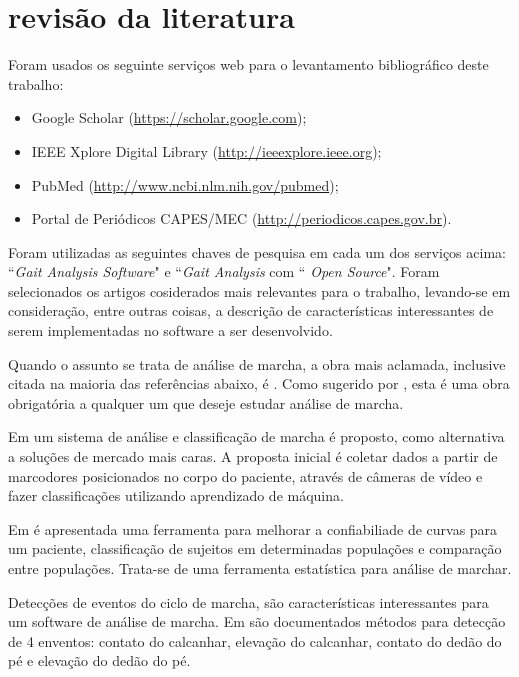 \section[REVISÃO DA LITERATURA]{revisão da literatura}
Foram usados os seguinte serviços web para o levantamento bibliográfico deste trabalho:
\begin{itemize}
	\item Google Scholar (\href{https://scholar.google.com/}{https://scholar.google.com});
	\item IEEE Xplore Digital Library (\href{http://ieeexplore.ieee.org}{http://ieeexplore.ieee.org});
	\item PubMed (\href{http://www.ncbi.nlm.nih.gov/pubmed}{http://www.ncbi.nlm.nih.gov/pubmed});
	\item Portal de Periódicos CAPES/MEC (\href{http://periodicos.capes.gov.br}{http://periodicos.capes.gov.br}).
\end{itemize}

Foram utilizadas as seguintes chaves de pesquisa em cada um dos serviços acima: ``\emph{Gait Analysis Software}" e ``\emph{Gait Analysis} com ``\emph{ Open Source}".
Foram selecionados os artigos cosiderados mais relevantes para o trabalho, levando-se em consideração, entre outras coisas, a descrição de características interessantes de serem implementadas no software a ser desenvolvido.

Quando o assunto se trata de análise de marcha, a obra mais aclamada, inclusive citada na maioria das referências abaixo, é \cite{Perry2010}.
Como sugerido por \cite{Malas}, esta é uma obra obrigatória a qualquer um que deseje estudar análise de marcha.

Em \cite{Vieira2015} um sistema de análise e classificação de marcha é proposto, como alternativa a soluções de mercado mais caras.
A proposta inicial é coletar dados a partir de marcodores posicionados no corpo do paciente, através de câmeras de vídeo e fazer classificações utilizando aprendizado de máquina.

Em \cite{Duhamel2004} é apresentada uma ferramenta para melhorar a confiabiliade de curvas para um paciente, classificação de sujeitos em determinadas populações e comparação entre populações.
Trata-se de uma ferramenta estatística para análise de marchar.

Detecções de eventos do ciclo de marcha, são características interessantes para um software de análise de marcha. 
Em \cite{Ghoussayni2004} são documentados métodos para detecção de 4 enventos: contato do calcanhar, elevação do calcanhar, contato do dedão do pé e elevação do dedão do pé.

